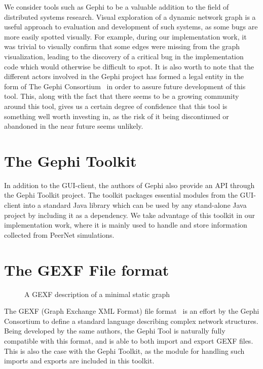 We consider tools such as Gephi to be a valuable addition to the field
of distributed systems research. Visual exploration of a dynamic network graph
is a useful approach to evaluation and development of such systems, as
some bugs are more easily spotted visually. For example, during our
implementation work, it was trivial to visually confirm that some edges
were missing from the graph visualization, leading to the discovery of a critical bug
in the implementation code which would otherwise be difficult to spot.
It is also worth to note that the different actors involved in the Gephi
project has formed a legal entity in the form of The Gephi
Consortium~\cite{gephi-consortium} in order to assure future development
of this tool. This, along with the fact that there seems to be a growing
community around this tool, gives us a certain degree of confidence that
this tool is something well worth investing in, as the risk of it
being discontinued or abandoned in the near future seems unlikely.

\section{The Gephi Toolkit}

In addition to the GUI-client, the authors of Gephi also provide an API
through the Gephi Toolkit project. The toolkit packages essential
modules from the GUI-client into a standard Java library which can
be used by any stand-alone Java project by including it as a dependency.
We take advantage of this toolkit in our implementation work, where it
is mainly used to handle and store information collected from PeerNet
simulations.

\section{The GEXF File format}

\begin{figure}[h]

\caption{A GEXF description of a minimal static graph}
\end{figure}

The GEXF (Graph Exchange XML Format) file format~\cite{gexf} is an
effort by the Gephi Consortium to define a standard language describing
complex network structures. Being developed by the same authors,
the Gephi Tool is naturally fully compatible with this format, and is
able to both import and export GEXF files. This is also the case with
the Gephi Toolkit, as the module for handling such imports and exports
are included in this toolkit.

